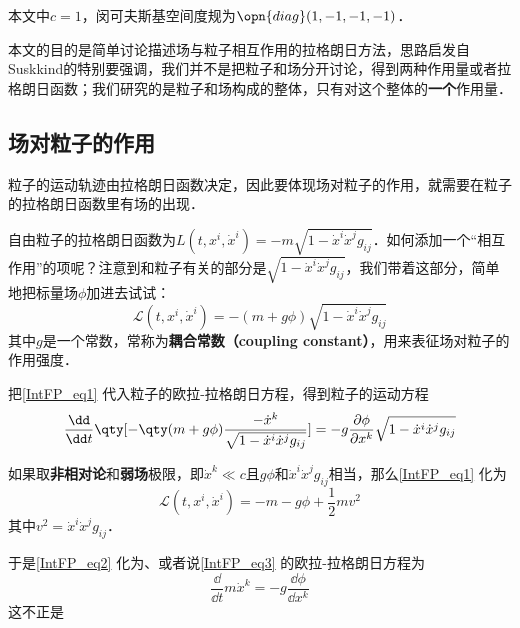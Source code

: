 

本文中$c=1$，闵可夫斯基空间度规为$\opn{diag}(1, -1, -1, -1)$．

本文的目的是简单讨论描述场与粒子相互作用的拉格朗日方法，思路启发自Suskkind的特别要强调，我们并不是把粒子和场分开讨论，得到两种作用量或者拉格朗日函数；我们研究的是粒子和场构成的整体，只有对这个整体的\textbf{一个}作用量．

\subsection{场对粒子的作用}

粒子的运动轨迹由拉格朗日函数决定，因此要体现场对粒子的作用，就需要在粒子的拉格朗日函数里有场的出现．

自由粒子的拉格朗日函数为$L(t, x^i, \dot{x}^i) = -m\sqrt{1-\dot{x}^i\dot{x}^jg_{ij}}$．如何添加一个“相互作用”的项呢？注意到和粒子有关的部分是$\sqrt{1-\dot{x}^i\dot{x}^jg_{ij}}$，我们带着这部分，简单地把标量场$\phi$加进去试试：
\begin{equation}\label{IntFP_eq1}
\mathcal{L}(t, x^i, \dot{x}^i) = -(m+g\phi)\sqrt{1-\dot{x}^i\dot{x}^jg_{ij}}
\end{equation}
其中$g$是一个常数，常称为\textbf{耦合常数（coupling constant）}，用来表征场对粒子的作用强度．

把\autoref{IntFP_eq1} 代入粒子的欧拉-拉格朗日方程，得到粒子的运动方程
\begin{equation}\label{IntFP_eq2}
\frac{\dd }{\dd t} \qty[-\qty(m+g\phi)\frac{-\dot{x}^k}{\sqrt{1-\dot{x}^i\dot{x}^jg_{ij}}}] = -g\frac{\partial \phi}{\partial x^k}\sqrt{1-\dot{x}^i\dot{x}^jg_{ij}}
\end{equation}

如果取\textbf{非相对论}和\textbf{弱场}极限，即$\dot{x}^k\ll c$且$g\phi$和$\dot{x}^i\dot{x}^jg_{ij}$相当，那么\autoref{IntFP_eq1} 化为
\begin{equation}\label{IntFP_eq3}
\mathcal{L}(t, x^i, \dot{x}^i) = -m-g\phi+\frac{1}{2}mv^2
\end{equation}
其中$v^2=\dot{x}^i\dot{x}^jg_{ij}$．

于是\autoref{IntFP_eq2} 化为、或者说\autoref{IntFP_eq3} 的欧拉-拉格朗日方程为
\begin{equation}
\frac{\dd}{\dd t} m\dot{x}^k = -g\frac{\dd \phi}{\dd x^k}
\end{equation}
这不正是

























